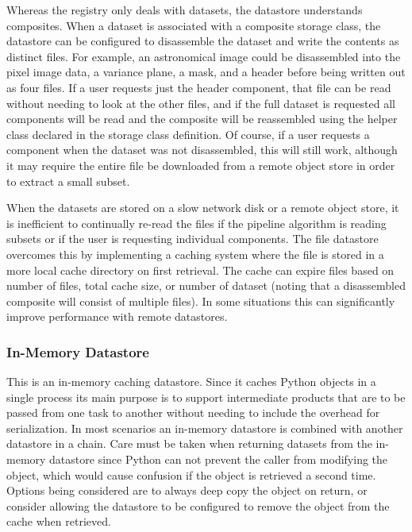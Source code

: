 \documentclass[]{spie}
\begin{document}
Whereas the registry only deals with datasets, the datastore understands composites.
When a dataset is associated with a composite storage class, the datastore can be configured to disassemble the dataset and write the contents as distinct files.
For example, an astronomical image could be disassembled into the pixel image data, a variance plane, a mask, and a header before being written out as four files.
If a user requests just the header component, that file can be read without needing to look at the other files, and if the full dataset is requested all components will be read and the composite will be reassembled using the helper class declared in the storage class definition.
Of course, if a user requests a component when the dataset was not disassembled, this will still work, although it may require the entire file be downloaded from a remote object store in order to extract a small subset.

When the datasets are stored on a slow network disk or a remote object store, it is inefficient to continually re-read the files if the pipeline algorithm is reading subsets or if the user is requesting individual components.
The file datastore overcomes this by implementing a caching system where the file is stored in a more local cache directory on first retrieval.
The cache can expire files based on number of files, total cache size, or number of dataset (noting that a disassembled composite will consist of multiple files).
In some situations this can significantly improve performance with remote datastores.

\subsubsection{In-Memory Datastore}

This is an in-memory caching datastore.
Since it caches Python objects in a single process its main purpose is to support intermediate products that are to be passed from one task to another without needing to include the overhead for serialization.
In most scenarios an in-memory datastore is combined with another datastore in a chain.
Care must be taken when returning datasets from the in-memory datastore since Python can not prevent the caller from modifying the object, which would cause confusion if the object is retrieved a second time.
Options being considered are to always deep copy the object on return, or consider allowing the datastore to be configured to remove the object from the cache when retrieved.
\end{document}
